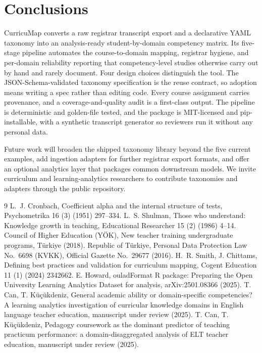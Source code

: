 \documentclass[11pt]{article}
\begin{document}
\section{Conclusions}
\label{sec:conclusions}

CurricuMap converts a raw registrar transcript export and a declarative YAML taxonomy into an analysis-ready student-by-domain competency matrix. Its five-stage pipeline automates the course-to-domain mapping, registrar hygiene, and per-domain reliability reporting that competency-level studies otherwise carry out by hand and rarely document. Four design choices distinguish the tool. The JSON-Schema-validated taxonomy specification is the reuse contract, so adoption means writing a spec rather than editing code. Every course assignment carries provenance, and a coverage-and-quality audit is a first-class output. The pipeline is deterministic and golden-file tested, and the package is MIT-licensed and pip-installable, with a synthetic transcript generator so reviewers run it without any personal data.

Future work will broaden the shipped taxonomy library beyond the five current examples, add ingestion adapters for further registrar export formats, and offer an optional analytics layer that packages common downstream models. We invite curriculum and learning-analytics researchers to contribute taxonomies and adapters through the public repository.

{\small
\begin{thebibliography}{9}
 L.~J. Cronbach, Coefficient alpha and the internal structure of tests, Psychometrika 16 (3) (1951) 297--334.
 L.~S. Shulman, Those who understand: Knowledge growth in teaching, Educational Researcher 15 (2) (1986) 4--14.
 Council of Higher Education (Y\"OK), New teacher training undergraduate programs, T\"urkiye (2018).
 Republic of T\"urkiye, Personal Data Protection Law No.\ 6698 (KVKK), Official Gazette No.\ 29677 (2016).
 H.~R. Smith, J. Chittams, Defining best practices and validation for curriculum mapping, Cogent Education 11 (1) (2024) 2342662.
 E. Howard, ouladFormat R package: Preparing the Open University Learning Analytics Dataset for analysis, arXiv:2501.08366 (2025).
 T. Can, T. K\"u\c{c}\"ukdeniz, General academic ability or domain-specific competencies? A learning analytics investigation of curricular knowledge domains in English language teacher education, manuscript under review (2025).
 T. Can, T. K\"u\c{c}\"ukdeniz, Pedagogy coursework as the dominant predictor of teaching practicum performance: a domain-disaggregated analysis of ELT teacher education, manuscript under review (2025).
\end{thebibliography}
}
\end{document}

